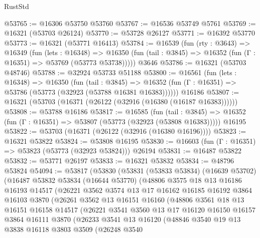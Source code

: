 \begin{lexlean}{RustStd}
\begin{coremodule}
@53765 := @16306 @53750 @53760
@53767 := @16536 @53749 @5761
@53769 := @16321 (@53703 @26124)
@53770 := @53728 @26127
@53771 := @16392 @53770
@53773 := @16321 (@53771 @16413)
@53784 := @16539
    (fun (rty : @3643) =>
    @16349
      (fun (lets : @16348) =>
      @16350 (fun (tail : @3845) => @16352 (fun (Γ : @16351) => @53769 (@53773 @53738)))))
    @3646
@53786 := @16321 (@53703 @48746)
@53788 := @32924 @53733 @51188
@53800 := @16561
    (fun (lets : @16348) =>
    @16350
      (fun (tail : @3845) =>
      @16352 (fun (Γ : @16351) => @53786 (@53773 (@32923 (@53788 @16381 @16383))))))
    @16186
@53807 := @16321 (@53703 (@16371 (@26122 (@32916 (@16380 (@16187 @16383))))))
@53808 := @53788 @16186
@53817 := @16585
    (fun (tail : @3845) => @16352 (fun (Γ : @16351) => @53807 (@53773 (@32923 (@53808 @16383)))))
    @16195
@53822 := @53703 (@16371 (@26122 (@32916 (@16380 @16196))))
@53823 := @16321 @53822
@53824 := @53808 @16195
@53830 := @16603 (fun (Γ : @16351) => @53823 (@53773 (@32923 @53824))) @26194
@53831 := @16487 @53822
@53832 := @53771 @26197
@53833 := @16321 @53832
@53834 := @48796 @53824
@54094 := @53817
    (@53830
      (@53831
        (@53833 @53834)
        (@16639 @53702)
        (@16487
          @53832
          @53834
          (@16644 @53770)
          (@48806
            @3575
            @18
            @13
            @16186
            @16193
            @14517
            (@26221
              @3562
              @3574
              @13
              @17
              @16162
              @16185
              @16192
              @3864
              @16103
              @3870
              (@26261
                @3562
                @13
                @16151
                @16160
                (@48806
                  @3561
                  @18
                  @13
                  @16151
                  @16158
                  @14517
                  (@26221
                    @3541
                    @3560
                    @13
                    @17
                    @16120
                    @16150
                    @16157
                    @3864
                    @16111
                    @3870
                    (@26233
                      @3541
                      @13
                      @16120
                      (@48846
                        @3540
                        @19
                        @13
                        @3838
                        @16118
                        @3803
                        @3509
                        (@26248
                          @3540

\end{coremodule}
\end{lexlean}
